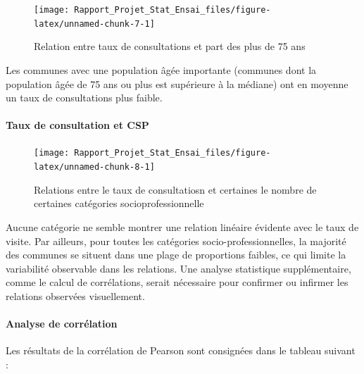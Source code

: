 \documentclass[
]{article}
\begin{document}
\begin{figure}

{\centering \texttt{[image: Rapport\_Projet\_Stat\_Ensai\_files/figure-latex/unnamed-chunk-7-1]} 

}

\caption{Relation entre taux de consultations et part des plus de 75 ans}\label{fig:unnamed-chunk-7}
\end{figure}

Les communes avec une population âgée importante (communes dont la
population âgée de 75 ans ou plus est supérieure à la médiane) ont en
moyenne un taux de consultations plus faible.

\paragraph{Taux de consultation et
CSP}\label{taux-de-consultation-et-csp}

\begin{figure}

{\centering \texttt{[image: Rapport\_Projet\_Stat\_Ensai\_files/figure-latex/unnamed-chunk-8-1]} 

}

\caption{Relations entre le taux de consultatiosn et certaines le nombre de certaines catégories socioprofessionnelle}\label{fig:unnamed-chunk-8}
\end{figure}

Aucune catégorie ne semble montrer une relation linéaire évidente avec
le taux de visite. Par ailleurs, pour toutes les catégories
socio-professionnelles, la majorité des communes se situent dans une
plage de proportions faibles, ce qui limite la variabilité observable
dans les relations. Une analyse statistique supplémentaire, comme le
calcul de corrélations, serait nécessaire pour confirmer ou infirmer les
relations observées visuellement.

\paragraph{Analyse de corrélation}\label{analyse-de-corruxe9lation}

Les résultats de la corrélation de Pearson sont consignées dans le
tableau suivant :
\end{document}
